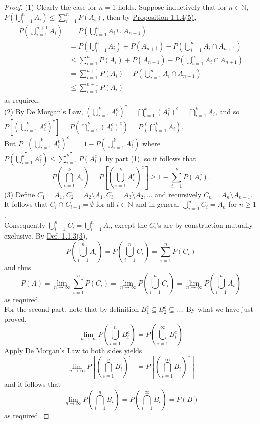 \documentclass[11pt,fleqn]{book} %
\begin{document}
\begin{proof}
(1) Clearly the case for \(n = 1\) holds. Suppose inductively that for \(n \in \mathbb{N}\), \(P\left(\bigcup_{i=1}^n A_i\right) \leq \sum_{i=1}^n P(A_i)\), then by \hyperref[prop:114e]{Proposition 1.1.4(5)}, 
\[
\begin{aligned}
P\left(\bigcup_{i=1}^{n+1}A_i\right) &= P\left(\bigcup_{i=1}^n A_i \cup A_{n+1}\right) \\
&= P\left(\bigcup_{i=1}^n A_i\right) + P(A_{n+1}) - P\left(\bigcup_{i=1}^n A_i \cap A_{n+1}\right) \\
&\leq \sum_{i=1}^nP(A_i) + P(A_{n+1}) - P\left(\bigcup_{i=1}^n A_i \cap A_{n+1}\right) \\
&= \sum_{i=1}^{n+1}P(A_i) - P\left(\bigcup_{i=1}^n A_i \cap A_{n+1}\right) \\
&\leq \sum_{i=1}^{n+1}P(A_i)
\end{aligned}
\]
as required.\\
(2) By De Morgan's Law, \(\left(\bigcup_{i=1}^k A_i^c\right)^c = \bigcap_{i=1}^k(A_i^c)^c = \bigcap_{i=1}^k A_i\), and so \(P\left[\left(\bigcup_{i=1}^kA_i^c\right)^c\right] = P\left(\bigcap_{i=1}^k(A_i^c)^c\right) = P\left(\bigcap_{i=1}^k A_i\right)\).\\
\indent But \(P\left[\left(\bigcup_{i=1}^kA_i^c\right)^c\right] = 1 - P\left(\bigcup_{i=1}^kA_i^c\right)\) where \(P\left(\bigcup_{i=1}^kA_i^c\right) \leq \sum_{i=1}^k P(A_i^c)\) by part (1), so it follows that
\[
P\left(\bigcap_{i=1}^k A_i\right) = P\left[\left(\bigcup_{i=1}^kA_i^c\right)^c\right] \geq 1 - \sum_{i=1}^kP(A_i^c).
\]
(3) Define \(C_1 = A_1, C_2 = A_2 \setminus A_1, C_3 = A_3 \setminus A_2, \ldots\) and recursively \(C_n = A_n \setminus A_{n-1}\). It follows that \(C_i \cap C_{i+1} = \emptyset\) for all \(i \in \mathbb{N}\) and in general \(\bigcup_{i=1}^n C_i = A_n\) for \(n \geq 1\).\\
\indent Consequently \(\bigcup_{i=1}^n C_i = \bigcup_{i=1}^n A_i\), except the \(C_i\)'s are by construction mutually exclusive. By \hyperref[def:113c]{Def. 1.1.3(3)},
\[
P\left(\bigcup_{i=1}^n A_i\right) = P\left(\bigcup_{i=1}^n C_i\right) = \sum_{i=1}^n P(C_i)
\]
and thus
\[
P(A) = \lim_{n\rightarrow\infty}\sum_{i=1}^nP(C_i) = \lim_{n\rightarrow\infty}P\left(\bigcup_{i=1}^nC_i\right) = \lim_{n\rightarrow\infty}P\left(\bigcup_{i=1}^n A_i\right)
\]
as required.\\
\indent For the second part, note that by definition \(B_1^c \subseteq B_2^c \subseteq \ldots\). By what we have just proved,
\[
\lim_{n\rightarrow\infty}P\left(\bigcup_{i=1}^n B_i^c\right) = P\left(\bigcup_{i=1}^\infty B_i^c\right)
\]
Apply De Morgan's Law to both sides yields
\[
\lim_{n\rightarrow\infty}P\left[\left(\bigcap_{i=1}^n B_i\right)^c\right] = P\left[\left(\bigcap_{i=1}^\infty B_i\right)^c\right]
\]
and it follows that
\[
\lim_{n\rightarrow\infty} P\left(\bigcap_{i=1}^n B_i\right) = P\left(\bigcap_{i=1}^\infty B_i\right) = P(B)
\]
as required.
\end{proof}
\end{document}
